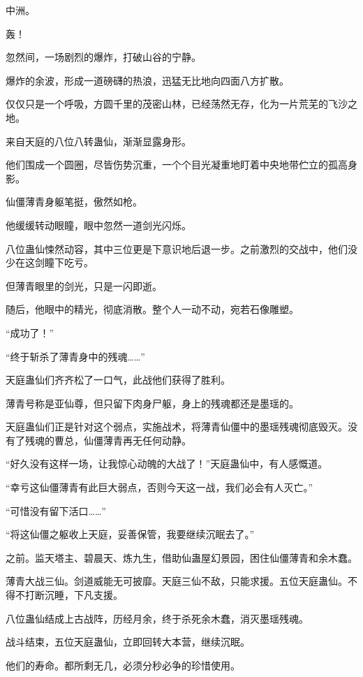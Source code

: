
\begin{this_body}

中洲。

轰！

忽然间，一场剧烈的爆炸，打破山谷的宁静。

爆炸的余波，形成一道磅礴的热浪，迅猛无比地向四面八方扩散。

仅仅只是一个呼吸，方圆千里的茂密山林，已经荡然无存，化为一片荒芜的飞沙之地。

来自天庭的八位八转蛊仙，渐渐显露身形。

他们围成一个圆圈，尽皆伤势沉重，一个个目光凝重地盯着中央地带伫立的孤高身影。

仙僵薄青身躯笔挺，傲然如枪。

他缓缓转动眼瞳，眼中忽然一道剑光闪烁。

八位蛊仙悚然动容，其中三位更是下意识地后退一步。之前激烈的交战中，他们没少在这剑瞳下吃亏。

但薄青眼里的剑光，只是一闪即逝。

随后，他眼中的精光，彻底消散。整个人一动不动，宛若石像雕塑。

“成功了！”

“终于斩杀了薄青身中的残魂……”

天庭蛊仙们齐齐松了一口气，此战他们获得了胜利。

薄青号称是亚仙尊，但只留下肉身尸躯，身上的残魂都还是墨瑶的。

天庭蛊仙们正是针对这个弱点，实施战术，将薄青仙僵中的墨瑶残魂彻底毁灭。没有了残魂的曹总，仙僵薄青再无任何动静。

“好久没有这样一场，让我惊心动魄的大战了！”天庭蛊仙中，有人感慨道。

“幸亏这仙僵薄青有此巨大弱点，否则今天这一战，我们必会有人灭亡。”

“可惜没有留下活口……”

“将这仙僵之躯收上天庭，妥善保管，我要继续沉眠去了。”

之前。监天塔主、碧晨天、炼九生，借助仙蛊屋幻景园，困住仙僵薄青和余木蠢。

薄青大战三仙。剑道威能无可披靡。天庭三仙不敌，只能求援。五位天庭蛊仙。不得不打断沉睡，下凡支援。

八位蛊仙结成上古战阵，历经月余，终于杀死余木蠢，消灭墨瑶残魂。

战斗结束，五位天庭蛊仙，立即回转大本营，继续沉眠。

他们的寿命。都所剩无几，必须分秒必争的珍惜使用。


\end{this_body}
